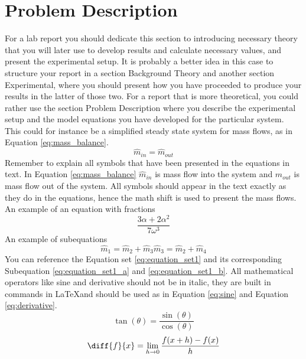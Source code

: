 \section{Problem Description}
\label{sec:problem_description}
For a lab report you should dedicate this section to introducing necessary theory that you will later use to develop results and calculate necessary values, and present the experimental setup. It is probably a better idea in this case to structure your report in a section Background Theory and another section Experimental, where you should present how you have proceeded to produce your results in the latter of those two. For a report that is more theoretical, you could rather use the section Problem Description where you describe the experimental setup and the model equations you have developed for the particular system. This could for instance be a simplified steady state system for mass flows, as in Equation \eqref{eq:mass_balance}.
\begin{equation}
    \label{eq:mass_balance}
    \hat{m}_{in} = \hat{m}_{out}
\end{equation}
Remember to explain all symbols that have been presented in the equations in text. In Equation \eqref{eq:mass_balance} $\hat{m}_{in}$ is mass flow into the system and $\hat{m}_{out}$ is mass flow out of the system. All symbols should appear in the text exactly as they do in the equations, hence the math shift is used to present the mass flows.
An example of an equation with fractions
\begin{equation}
    \frac
    {3\alpha + 2\alpha^2}
    {7\omega^3}
\end{equation}
An example of subequations
\begin{subequations}
    \label{eq:equation_set1}
    \begin{equation}
        \label{eq:equation_set1_a}
        \hat{m}_{1} = \hat{m}_{2} + \hat{m}_{3}
    \end{equation}
    \begin{equation}
        \label{eq:equation_set1_b}
        \hat{m}_{3} = \hat{m}_{2} + \hat{m}_{4}
    \end{equation}
\end{subequations}
You can reference the Equation set \eqref{eq:equation_set1} and its corresponding Subequation \eqref{eq:equation_set1_a} and \eqref{eq:equation_set1_b}.
All mathematical operators like sine and derivative should not be in italic, they are built in commands in \LaTeX and should be used as in Equation \eqref{eq:sine} and Equation \eqref{eq:derivative}. 
\begin{equation}
    \label{eq:sine}
    \tan (\theta) = \frac{\sin (\theta)}
                        {\cos (\theta)}
\end{equation}
\begin{equation}
    \label{eq:derivative}
    \diff{f}{x} = \lim_{h\to0}
                    \frac{f(x+h)-f(x)}
                        {h}
\end{equation}


